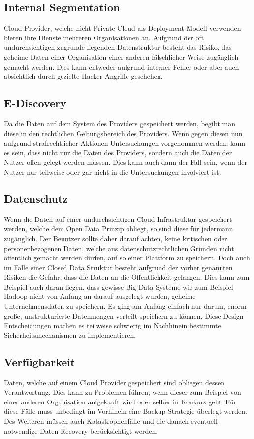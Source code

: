 \documentclass{report}
\begin{document}
\subsection{Internal Segmentation}
Cloud Provider, welche nicht Private Cloud als Deployment Modell verwenden bieten ihre Dienste mehreren Organisationen an. Aufgrund der oft undurchsichtigen zugrunde liegenden Datenstruktur besteht das Risiko, das geheime Daten einer Organisation einer anderen fälschlicher Weise zugänglich gemacht werden. Dies kann entweder aufgrund interner Fehler oder aber auch absichtlich durch gezielte Hacker Angriffe geschehen. \cite{mos2011}

\subsection{E-Discovery}
Da die Daten auf dem System des Providers gespeichert werden, begibt man diese in den rechtlichen Geltungsbereich des Providers. Wenn gegen diesen nun aufgrund strafrechtlicher Aktionen Untersuchungen vorgenommen werden, kann es sein, dass nicht nur die Daten des Providers, sondern auch die Daten der Nutzer offen gelegt werden müssen. Dies kann auch dann der Fall sein, wenn der Nutzer nur teilweise oder gar nicht in die Untersuchungen involviert ist. \cite{mos2011}

\subsection{Datenschutz}
Wenn die Daten auf einer undurchsichtigen Cloud Infrastruktur gespeichert werden, welche dem Open Data Prinzip obliegt, so sind diese für jedermann zugänglich. Der Benutzer sollte daher darauf achten, keine kritischen oder personenbezogenen Daten, welche aus datenschutzrechtlichen Gründen nicht öffentlich gemacht werden dürfen, auf so einer Plattform zu speichern. Doch auch im Falle einer Closed Data Struktur besteht aufgrund der vorher genannten Risiken die Gefahr, dass die Daten an die Öffentlichkeit gelangen. Dies kann zum Beispiel auch daran liegen, dass gewisse Big Data Systeme wie zum Beispiel Hadoop nicht von Anfang an darauf ausgelegt wurden, geheime Unternehmensdaten zu speichern. Es ging am Anfang einfach nur darum, enorm große, unstrukturierte Datenmengen verteilt speichern zu können. Diese Design Entscheidungen machen es teilweise schwierig im Nachhinein bestimmte Sicherheitsmechanismen zu implementieren. \cite{haa2013}

\subsection{Verfügbarkeit}
Daten, welche auf einem Cloud Provider gespeichert sind obliegen dessen Verantwortung. Dies kann zu Problemen führen, wenn dieser zum Beispiel von einer anderen Organisation aufgekauft wird oder selber in Konkurs geht. Für diese Fälle muss unbedingt im Vorhinein eine Backup Strategie überlegt werden. Des Weiteren müssen auch Katastrophenfälle und die danach eventuell notwendige Daten Recovery berücksichtigt werden. \cite{mos2011}
\end{document}
